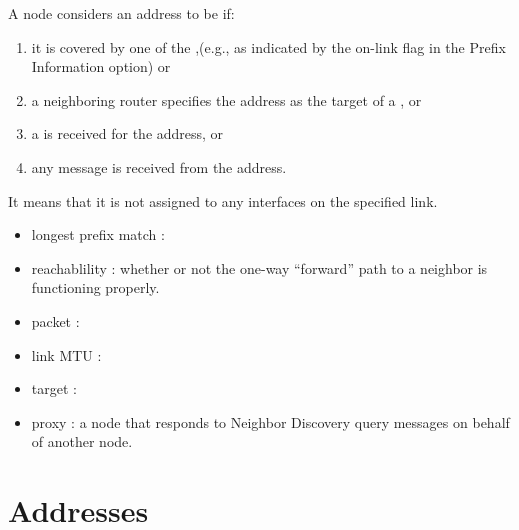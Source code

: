 \documentclass[dvipsnames]{article}
\begin{document}
\begin{itemize}
{    A node considers an address to be  if:

    \begin{enumerate}
    \item it is covered by one of the ,(e.g., as indicated
      by the on-link flag in the Prefix Information option) or
    \item a neighboring router specifies the address as the target of a , or
    \item a  is received for the address, or
    \item any  message is received from the address.
    \end{enumerate}

     It means
    that it is not assigned to any interfaces on the specified link.
  }
\end{itemize}



\begin{itemize}
\item longest prefix match : 
\item reachablility : whether or not the one-way ``forward'' path to a neighbor
  is functioning properly. 
\item packet : 
\item link MTU : 
\item target : 
\item proxy : a node that responds to Neighbor Discovery query messages on
  behalf of another node. 
\end{itemize}

\section{Addresses}
\end{document}
